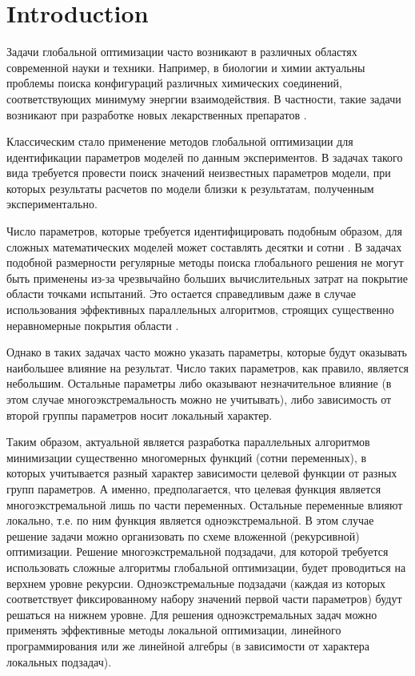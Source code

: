\documentclass{svproc}
\begin{document}
\section{Introduction}

Задачи глобальной оптимизации часто возникают в различных областях современной науки и техники. Например, в биологии и химии актуальны проблемы поиска конфигураций различных химических соединений, соответствующих минимуму энергии взаимодействия. В частности, такие задачи возникают при разработке новых лекарственных препаратов \cite{Sulimov}. 

Классическим стало применение методов глобальной оптимизации для идентификации параметров моделей по данным экспериментов. В задачах такого вида требуется провести поиск значений неизвестных параметров модели, при которых результаты расчетов по модели  близки к результатам, полученным экспериментально.

Число параметров, которые требуется идентифицировать подобным образом, для сложных математических моделей может составлять десятки и сотни \cite{Nurislamova2016,Akhmadullina2017}. В задачах подобной размерности регулярные методы поиска глобального решения не могут быть применены из-за чрезвычайно больших вычислительных затрат на покрытие области точками испытаний. Это остается справедливым даже в случае использования эффективных параллельных алгоритмов, строящих существенно неравномерные покрытия области \cite{Paulavicius2011,Evtushenko2009,Jones2009}. 

Однако в таких задачах часто можно указать параметры, которые будут оказывать наибольшее влияние на результат. Число таких параметров, как правило, является небольшим. Остальные параметры либо оказывают незначительное влияние (в этом случае многоэкстремальность можно не учитывать), либо зависимость от второй группы параметров носит локальный характер.

Таким образом, актуальной является разработка параллельных алгоритмов минимизации существенно многомерных функций (сотни переменных), в которых учитывается разный характер зависимости целевой функции от разных групп параметров. А именно, предполагается, что целевая функция является многоэкстремальной лишь по части переменных. Остальные переменные влияют локально, т.е. по ним функция является одноэкстремальной. 
В этом случае решение задачи можно организовать по схеме вложенной (рекурсивной) оптимизации. Решение  многоэкстремальной подзадачи, для которой требуется использовать сложные алгоритмы глобальной оптимизации, будет проводиться на верхнем уровне рекурсии.
Одноэкстремальные подзадачи (каждая из которых соответствует фиксированному набору значений первой части параметров) будут решаться на нижнем уровне. Для решения одноэкстремальных задач можно применять эффективные методы локальной оптимизации, линейного программирования или же линейной алгебры (в зависимости от характера локальных подзадач).
\end{document}
